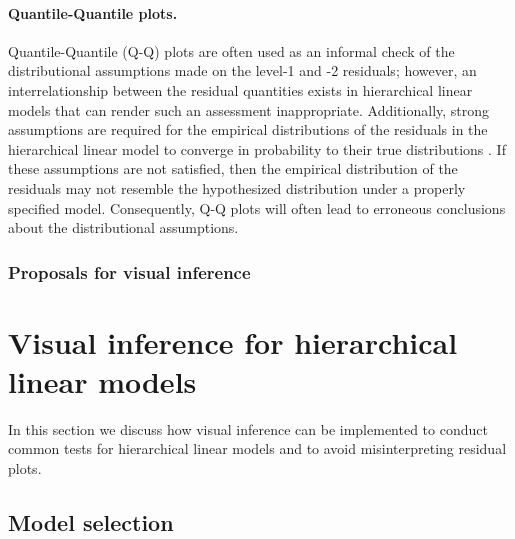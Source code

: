 \documentclass{article} %
\begin{document}
\paragraph{Quantile-Quantile plots.}
Quantile-Quantile (Q-Q) plots are often used as an informal check of the distributional assumptions made on the level-1 and -2 residuals; however, an interrelationship between the residual quantities exists in hierarchical linear models that can render such an assessment inappropriate. Additionally, strong assumptions are required for the empirical distributions of the residuals in the hierarchical linear model to converge in probability to their true distributions \citep[Theorem 3.2 and Lemma 3.1]{Jiang:1998vt}. If these assumptions are not satisfied, then the empirical distribution of the residuals may not resemble the hypothesized distribution under a properly specified model. Consequently, Q-Q plots will often lead to erroneous conclusions about the distributional assumptions.


\subsubsection{Proposals for visual inference}




\section{Visual inference for hierarchical linear models}

In this section we discuss how visual inference can be implemented to conduct common tests for hierarchical linear models and to avoid misinterpreting residual plots. 


\subsection{Model selection}
\end{document}
